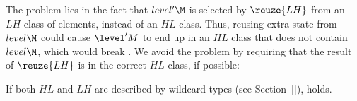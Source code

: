 The problem lies in the fact that $level'\M$ is selected by $\reuze{LH}$ from an $LH$ class of elements, instead of an $HL$ class. Thus, reusing extra state from $level\M$ could cause $\level'M$ to end up in an $HL$ class that does not contain $level\M$, which would break . We avoid the problem by requiring that the result of $\reuze{LH}$ is in the correct $HL$ class, if possible:


If both $HL$ and $LH$ are described by wildcard types (see Section~\ref{}),  holds.

%
%
%





